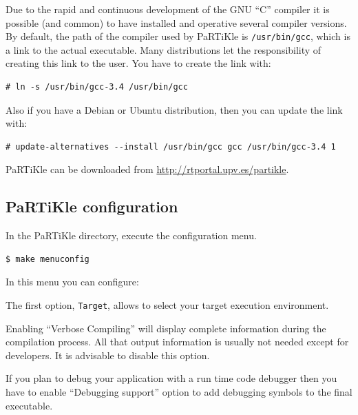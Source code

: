 \documentclass[a4paper,10pt,twoside]{report}
\newcommand{\partikle}[0]{PaRTiKle}
\begin{document}
Due to the rapid and continuous development of the GNU ``C'' compiler
it is possible (and common) to have installed and operative several
compiler versions. By default, the path of the compiler used by
PaRTiKle is \texttt{/usr/bin/gcc}, which is a link to the actual
executable. Many distributions let the responsibility of creating this
link to the user. You have to create the link with:
\begin{verbatim}
# ln -s /usr/bin/gcc-3.4 /usr/bin/gcc
\end{verbatim}

Also if you have a Debian or Ubuntu distribution, then you can update
the link with:
\begin{verbatim}
# update-alternatives --install /usr/bin/gcc gcc /usr/bin/gcc-3.4 1
\end{verbatim}



\partikle{} can be downloaded from \url{http://rtportal.upv.es/partikle}.
\subsection{PaRTiKle configuration}

In the \partikle{} directory, execute the configuration menu.
\begin{verbatim}
$ make menuconfig
\end{verbatim}
In this menu you can configure: 


The first option, \texttt{Target}, allows to select your target
execution environment.

Enabling ``Verbose Compiling'' will display complete information
during the compilation process. All that output information is usually
not needed except for developers. It is advisable to disable this
option.

If you plan to debug your application with a run time code debugger
then you have to enable ``Debugging support'' option to add debugging
symbols to the final executable.
\end{document}
